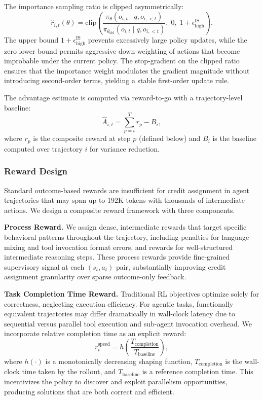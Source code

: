 The importance sampling ratio is clipped asymmetrically:
\begin{equation}
\hat{r}_{i,t}(\theta) = \mathrm{clip}\!\left(\frac{\pi_\theta(o_{i,t} \mid q, o_{i,<t})}{\pi_{\theta_{\text{old}}}(o_{i,t} \mid q, o_{i,<t})},\; 0,\; 1 + \epsilon_{\text{high}}^{\text{IS}}\right).
\end{equation}
The upper bound $1 + \epsilon_{\text{high}}^{\text{IS}}$ prevents excessively large policy updates, while the zero lower bound permits aggressive down-weighting of actions that become improbable under the current policy. The stop-gradient on the clipped ratio ensures that the importance weight modulates the gradient magnitude without introducing second-order terms, yielding a stable first-order update rule.

The advantage estimate is computed via reward-to-go with a trajectory-level baseline:
\begin{equation}
\hat{A}_{i,t} = \sum_{p=t}^{T} r_p - B_i,
\end{equation}
where $r_p$ is the composite reward at step $p$ (defined below) and $B_i$ is the baseline computed over trajectory $i$ for variance reduction.

\subsubsection{Reward Design}

Standard outcome-based rewards are insufficient for credit assignment in agent trajectories that may span up to 192K tokens with thousands of intermediate actions. We design a composite reward framework with three components.

\noindent \textbf{Process Reward.} We assign dense, intermediate rewards that target specific behavioral patterns throughout the trajectory, including penalties for language mixing and tool invocation format errors, and rewards for well-structured intermediate reasoning steps. These process rewards provide fine-grained supervisory signal at each $(s_t, a_t)$ pair, substantially improving credit assignment granularity over sparse outcome-only feedback.

\noindent \textbf{Task Completion Time Reward.} Traditional RL objectives optimize solely for correctness, neglecting execution efficiency. For agentic tasks, functionally equivalent trajectories may differ dramatically in wall-clock latency due to sequential versus parallel tool execution and sub-agent invocation overhead. We incorporate relative completion time as an explicit reward:
\begin{equation}
r^{\text{speed}}_t = h\!\left(\frac{T_{\text{completion}}}{T_{\text{baseline}}}\right),
\end{equation}
where $h(\cdot)$ is a monotonically decreasing shaping function, $T_{\text{completion}}$ is the wall-clock time taken by the rollout, and $T_{\text{baseline}}$ is a reference completion time. This incentivizes the policy to discover and exploit parallelism opportunities, producing solutions that are both correct and efficient.

